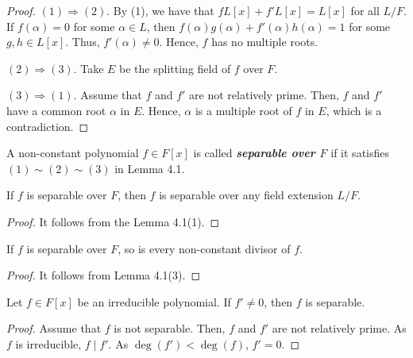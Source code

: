 \documentclass[twoside]{article}
\theoremstyle{remark}
\newcommand*\term[1]{\textbf{\textit{\mathversion{bold}#1}}}
\begin{document}
\begin{proof}
  \((1) \Rightarrow (2)\). By (1), we have that \(f L[x] + f' L[x] = L[x]\) for all \(L/F\). If \(f(\alpha) = 0\) for some \(\alpha \in L\), then \(f(\alpha) g(\alpha) + f'(\alpha) h(\alpha) = 1\) for some \(g,h \in L[x]\). Thus, \(f'(\alpha) \neq 0\). Hence, \(f\) has no multiple roots.
  
  \smallskip
  
  \((2) \Rightarrow (3)\). Take \(E\) be the splitting field of \(f\) over \(F\).
  
  \smallskip
  
  \((3) \Rightarrow (1)\). Assume that \(f\) and \(f'\) are not relatively prime. Then, \(f\) and \(f'\) have a common root \(\alpha\) in \(E\). Hence, \(\alpha\) is a multiple root of \(f\) in \(E\), which is a contradiction.
\end{proof}

\begin{definition}
  A non-constant polynomial \(f \in F[x]\) is called \term{separable over \(F\)} if it satisfies \((1) \sim (2) \sim (3)\) in Lemma 4.1.
\end{definition}

\begin{corollary}
  If \(f\) is separable over \(F\), then \(f\) is separable over any field extension \(L/F\).
\end{corollary}

\begin{proof}
  It follows from the Lemma 4.1(1).
\end{proof}

\begin{corollary}
  If \(f\) is separable over \(F\), so is every non-constant divisor of \(f\).
\end{corollary}

\begin{proof}
  It follows from Lemma 4.1(3).
\end{proof}

\begin{corollary}
  Let \(f \in F[x]\) be an irreducible polynomial. If \(f' \neq 0\), then \(f\) is separable.
\end{corollary}

\begin{proof}
  Assume that \(f\) is not separable. Then, \(f\) and \(f'\) are not relatively prime. As \(f\) is irreducible, \(f \mid f'\). As \(\deg(f') < \deg(f)\), \(f' = 0\).
\end{proof}
\end{document}
